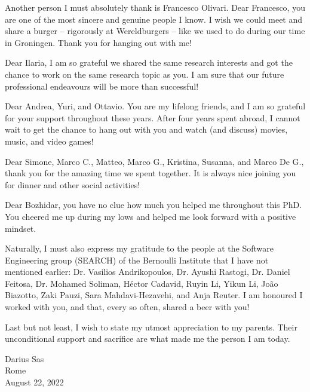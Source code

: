 Another person I must absolutely thank is Francesco Olivari. Dear Francesco, you are one of the most sincere and genuine people I know.  
I wish we could meet and share a burger -- rigorously at Wereldburgers -- like we used to do during our time in Groningen.
Thank you for hanging out with me! 

Dear Ilaria, I am so grateful we shared the same research interests and got the chance to work on the same research topic as you. I am sure that our future professional endeavours will be more than successful!

Dear Andrea, Yuri, and Ottavio. You are my lifelong friends, and I am so grateful for your support throughout these years. 
After four years spent abroad, I cannot wait to get the chance to hang out with you and watch (and discuss) movies, music, and video games!

Dear Simone, Marco C., Matteo, Marco G., Kristina, Susanna, and Marco De G., thank you for the amazing time we spent together. It is always nice joining you for dinner and other social activities!

Dear Bozhidar, you have no clue how much you helped me throughout this PhD. You cheered me up during my lows and helped me look forward with a positive mindset.

Naturally, I must also express my gratitude to the people at the Software Engineering group (SEARCH) of the Bernoulli Institute that I have not mentioned earlier: Dr. Vasilios Andrikopoulos,  Dr. Ayushi Rastogi, Dr. Daniel Feitosa,  Dr. Mohamed Soliman, H\'ector Cadavid, Ruyin Li, Yikun Li, João Biazotto, Zaki Pauzi, Sara Mahdavi-Hezavehi, and Anja Reuter. 
I am honoured I worked with you, and that, every so often, shared a beer with you!

Last but not least, I wish to state my utmost appreciation to my parents.
Their unconditional support and sacrifice are what made me the person I am today.


\begin{flushright}
    Darius Sas\\
    Rome\\
    August 22, 2022
\end{flushright}
